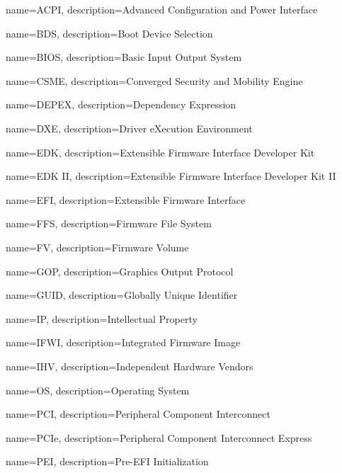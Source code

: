  {
	name=ACPI,
	description={Advanced Configuration and Power Interface
	}
}

 {
	name=BDS,
	description={Boot Device Selection
	}
}

 {
    name=BIOS,
    description={Basic Input Output System
    }
}


 {
    name=CSME,
    description={Converged Security and Mobility Engine
    }
}

 {
	name=DEPEX,
	description={Dependency Expression
	}
}


 {
	name=DXE,
	description={Driver eXecution Environment 
	}
}

 {
	name=EDK,
	description={Extensible Firmware Interface Developer Kit
	}
}

 {
	name={EDK II},
	description={Extensible Firmware Interface Developer Kit II
	}
}

 {
	name=EFI,
	description={Extensible Firmware Interface
	}
}

 {
    name=FFS,
    description={Firmware File System
    }
}

 {
    name=FV,
    description={Firmware Volume
    }
}

 {
    name=GOP,
    description={Graphics Output Protocol
    }
}

 {
    name=GUID,
    description={Globally Unique Identifier
    }
}

 {
    name=IP,
    description={Intellectual Property
    }
}

 {
    name=IFWI,
    description={Integrated Firmware Image
    }
}

 {
    name=IHV,
    description={Independent Hardware Vendors
    }
}

 {
	name=OS,
	description={Operating System
	}
}

 {
	name=PCI,
	description={Peripheral Component Interconnect
	}
}

 {
	name=PCIe,
	description={Peripheral Component Interconnect Express
	}
}

 {
    name=PEI,
    description={Pre-EFI Initialization
    }
}

